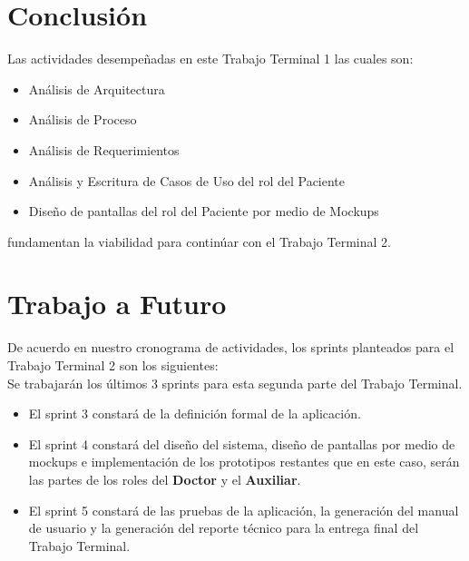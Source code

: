 \section{Conclusión}

Las actividades desempeñadas en este Trabajo Terminal 1 las cuales son:
\begin{itemize}
	\item Análisis de Arquitectura
	\item Análisis de Proceso
	\item Análisis de Requerimientos
	\item Análisis y Escritura de Casos de Uso del rol del Paciente
	\item Diseño de pantallas del rol del Paciente por medio de Mockups
\end{itemize}

fundamentan la viabilidad para continúar con el Trabajo Terminal 2.

\section{Trabajo a Futuro}
De acuerdo en nuestro cronograma de actividades, los sprints planteados para el Trabajo Terminal 2 son los siguientes:\\

Se trabajarán los últimos 3 sprints para esta segunda parte del Trabajo Terminal.
\begin{itemize}
	\item El sprint 3 constará de la definición formal de la aplicación.
	\item El sprint 4 constará del diseño del sistema, diseño de pantallas por medio de mockups e implementación de los prototipos restantes que en este caso, serán las partes de los roles del \textbf{Doctor} y el \textbf{Auxiliar}.
	\item El sprint 5 constará de las pruebas de la aplicación, la generación del manual de usuario y la generación del reporte técnico para la entrega final del Trabajo Terminal.
\end{itemize}

